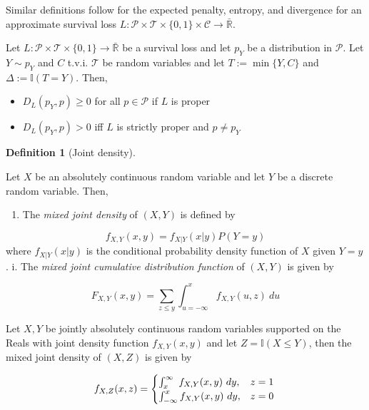 \documentclass[
  letterpaper,
]{scrbook}
\providecommand{\tightlist}{%
  \setlength{\itemsep}{0pt}\setlength{\parskip}{0pt}}\usepackage{longtable,booktabs,array}
\theoremstyle{plain}
\theoremstyle{definition}
\newtheorem{definition}{Definition}[chapter]
\theoremstyle{remark}
\begin{document}
Similar definitions follow for the expected penalty, entropy, and
divergence for an approximate survival loss
\(L: \mathcal{P}\times \mathcal{T}\times \{0,1\}\times \mathcal{C}\rightarrow \bar{\mathbb{R}}\).

\leavevmode{}%
\label{lem:divergence} Let
\(L: \mathcal{P}\times \mathcal{T}\times \{0,1\}\rightarrow \bar{\mathbb{R}}\)
be a survival loss and let \(p_Y\) be a distribution in \(\mathcal{P}\).
Let \(Y \sim p_Y\) and \(C\) t.v.i. \(\mathcal{T}\) be random variables
and let \(T := \min\{Y,C\}\) and \(\Delta := \mathbb{I}(T=Y)\). Then,

\begin{itemize}
\tightlist
\item
  \(D_L(p_Y, p) \geq 0\) for all \(p \in \mathcal{P}\) if \(L\) is
  proper
\item
  \(D_L(p_Y, p) > 0\) iff \(L\) is strictly proper and \(p \neq p_Y\)
\end{itemize}

\leavevmode{}%
\begin{definition}[Joint density]\label{def-joints}

Let \(X\) be an absolutely continuous random variable and let \(Y\) be a
discrete random variable. Then,

\begin{enumerate}
\def\labelenumi{\roman{enumi}.}
\tightlist
\item
  The \emph{mixed joint density} of \((X,Y)\) is defined by
\end{enumerate}

\[
f_{X,Y}(x,y) = f_{X|Y}(x|y)P(Y = y)
\] where \(f_{X|Y}(x|y)\) is the conditional probability density
function of \(X\) given \(Y = y\). i. The \emph{mixed joint cumulative
distribution function} of \((X,Y)\) is given by

\[
F_{X,Y}(x,y) =  \sum_{z \leq y} \int_{u=-\infty}^x f_{X,Y}(u, z) \ du
\]

\end{definition}

\leavevmode{}%
\label{lem:joints} Let \(X,Y\) be jointly absolutely continuous random
variables supported on the Reals with joint density function
\(f_{X,Y}(x,y)\) and let \(Z = \mathbb{I}(X \leq Y)\), then the mixed
joint density of \((X,Z)\) is given by

\[
f_{X,Z}(x,z) =
\begin{cases}
\int^\infty_x \ f_{X,Y}(x,y) \ dy, & z = 1 \\
\int^x_{-\infty} f_{X,Y}(x,y) \ dy, & z = 0
\end{cases} \\
\]
\end{document}

